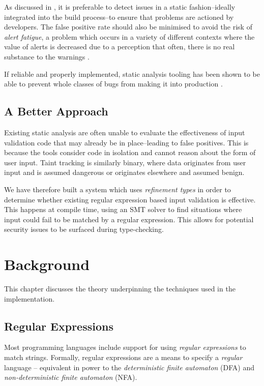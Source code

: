 \documentclass[a4paper,openany]{book}
\begin{document}
As discussed in \citet{sadowski2018lessons}, it is preferable to detect issues in a static fashion--ideally integrated into the build process--to ensure that problems are actioned by developers. The false positive rate should also be minimised to avoid the risk of \emph{alert fatigue}, a problem which occurs in a variety of different contexts where the value of alerts is decreased due to a perception that often, there is no real substance to the warnings \citep{kesselheim2011clinical}.

If reliable and properly implemented, static analysis tooling has been shown to be able to prevent whole classes of bugs from making it into production \citep{sadowski2018lessons}.

\section{A Better Approach}

Existing static analysis are often unable to evaluate the effectiveness of input validation code that may already be in place--leading to false positives. This is because the tools consider code in isolation and cannot reason about the form of user input. Taint tracking is similarly binary, where data originates from user input and is assumed dangerous or originates elsewhere and assumed benign.

We have therefore built a system which uses \emph{refinement types} in order to determine whether existing regular expression based input validation is effective. This happens at compile time, using an SMT solver to find situations where input could fail to be matched by a regular expression. This allows for potential security issues to be surfaced during type-checking.

\chapter{Background}
This chapter discusses the theory underpinning the techniques used in the implementation.


\section{Regular Expressions}

Most programming languages include support for using \emph{regular expressions} to match strings. Formally, regular expressions are a means to specify a \emph{regular} language -- equivalent in power to the \emph{deterministic finite automaton} (DFA) and \emph{non-deterministic finite automaton} (NFA).
\end{document}
